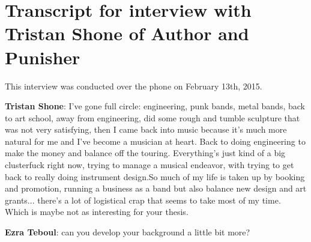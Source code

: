 \section{Transcript for interview with Tristan Shone of Author and Punisher}

This interview was conducted over the phone on February 13th, 2015. 

\textbf{Tristan Shone}: I've gone full circle: engineering, punk bands, metal bands, back to art school, away from engineering, did some rough and tumble sculpture that was not very satisfying, then I came back into music because it's much more natural for me and I've become a musician at heart. Back to doing engineering to make the money and balance off the touring. Everything's just kind of a big clusterfuck right now, trying to manage a musical endeavor, with trying to get back to really doing instrument design.So much of my life is taken up by booking and promotion, running a business as a band but also balance new design and art grants... there's a lot of logistical crap that seems to take most of my time. Which is maybe not as interesting for your thesis. 

\textbf{Ezra Teboul}: can you develop your background a little bit more?

